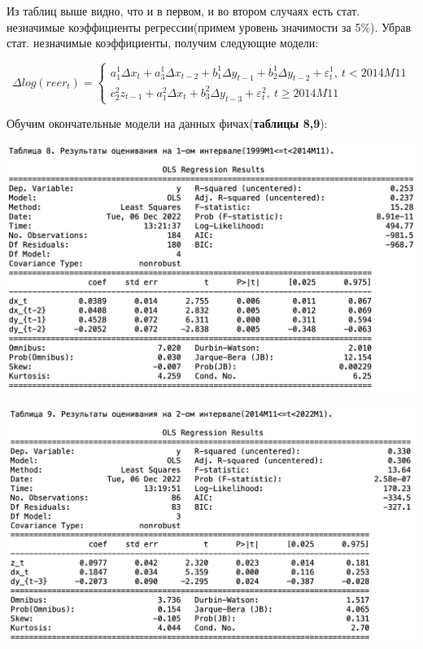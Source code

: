 \documentclass{article}
\begin{document}
Из таблиц выше видно, что и в первом, и во втором случаях есть стат. незначимые коэффициенты регрессии(примем уровень значимости за 5\%). Убрав стат. незначимые коэффициенты, получим следующие модели:

\begin{equation*}
\Delta log(reer_t)=
 \begin{cases}
   a^1_1\Delta x_t + a^1_3\Delta x_{t-2} + b^1_1\Delta y_{t-1} + b^1_2\Delta y_{t-2} + \varepsilon^1_t,~t<2014M11
   \\
   c^2_2z_{t-1}+a^2_1\Delta x_t+b^2_3\Delta y_{t-3} +\varepsilon^2_t,~t\geq 2014M11
 \end{cases}
\end{equation*}

Обучим окончательные модели на данных фичах(\textbf{таблицы 8,9}):

\begin{center}
\includegraphics[width=150mm]{pics/table8.png}
\end{center}

\begin{center}
\includegraphics[width=150mm]{pics/table9.png}
\end{center}
\end{document}

